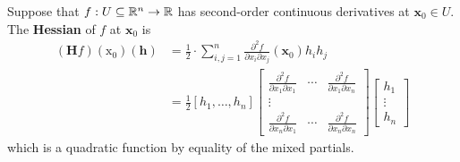 \begin{defn}[Hessian]
    Suppose that $f: U \subseteq \mathbb{R}^n \rightarrow \mathbb{R}$ has second-order continuous derivatives at $\mathbf{x}_0 \in U$. The \textbf{Hessian} of $f$ at $\mathbf{x}_0$ is
    \begin{align*}
        (\mathbf{H} f) \left(\mathrm{x}_0\right)(\mathbf{h}) &= \frac{1}{2} \cdot \sum_{i, j=1}^n \frac{\partial^2 f}{\partial x_i \partial x_j}\left(\mathbf{x}_0\right) h_i h_j \\
        &=\frac{1}{2}\left[h_1, \ldots, h_n\right]\left[\begin{array}{ccc}
        \frac{\partial^2 f}{\partial x_1 \partial x_1} & \cdots & \frac{\partial^2 f}{\partial x_1 \partial x_n} \\
        \vdots & & \\
        \frac{\partial^2 f}{\partial x_n \partial x_1} & \cdots & \frac{\partial^2 f}{\partial x_n \partial x_n}
        \end{array}\right]\left[\begin{array}{c}
        h_1 \\
        \vdots \\
        h_n
        \end{array}\right]
    \end{align*}
    which is a quadratic function by equality of the mixed partials. 
\end{defn}

